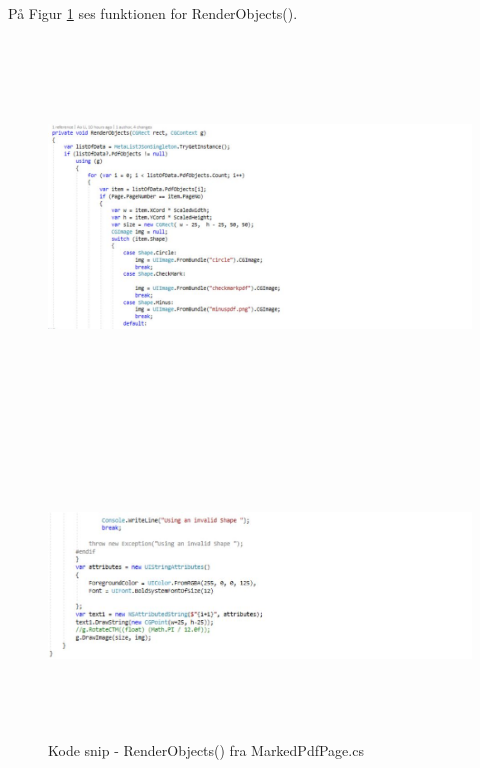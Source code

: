På Figur \ref{fig:Render} ses funktionen for RenderObjects().
\begin{figure}[H] %
	\centering
	\includegraphics[height=10cm, width=15cm]{../ArkitekturDesign/Design/RegisterPDF/Render1}
\end{figure}
\begin{figure}[H] %
	\centering
	\includegraphics[height=8cm, width=15cm]{../ArkitekturDesign/Design/RegisterPDF/Render2}
	\caption{Kode snip - RenderObjects() fra MarkedPdfPage.cs}
	\label{fig:Render}
\end{figure}


\clearpage

